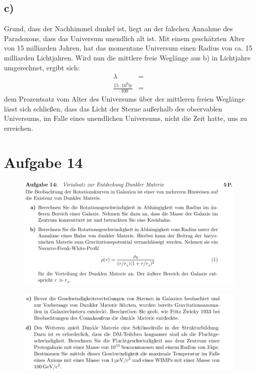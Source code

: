 \subsection{c)}

    \justifying Grund, dass der Nachhimmel dunkel ist, liegt an der falschen Annahme des Paradoxons, dass das Universum 
    unendlich alt ist. Mit einem geschätzten Alter von 15 milliarden Jahren, hat das momentane Universum einen Radius von ca. 15 milliarden
    Lichtjahren. Wird nun die mittlere freie Weglänge aus b) in Lichtjahre umgerechnet, ergibt sich:
    \begin{align*}
        \lambda &= \text{}\\
        \frac{15\cdot 10^9\text{ly}}{\text{}\cdot 100} &= \text{}
    \end{align*}
    \justifying dem Prozentsatz vom Alter des Universums über der mittleren freien Weglänge lässt sich schließen,
    dass das Licht der Sterne außerhalb des observablen Universums, im Falle eines unendlichen Universums, nicht die Zeit hatte,
    uns zu erreichen. 


\section{Aufgabe 14}

    \begin{figure}[H]
        \centering
        \includegraphics[width=\textwidth]{images/Aufgabe14ab.jpg}
        \label{fig:2}
    \end{figure}

    \begin{figure}[H]
        \centering
        \includegraphics[width=\textwidth]{images/Aufgabe14cd.jpg}
        \label{fig:3}
    \end{figure}

